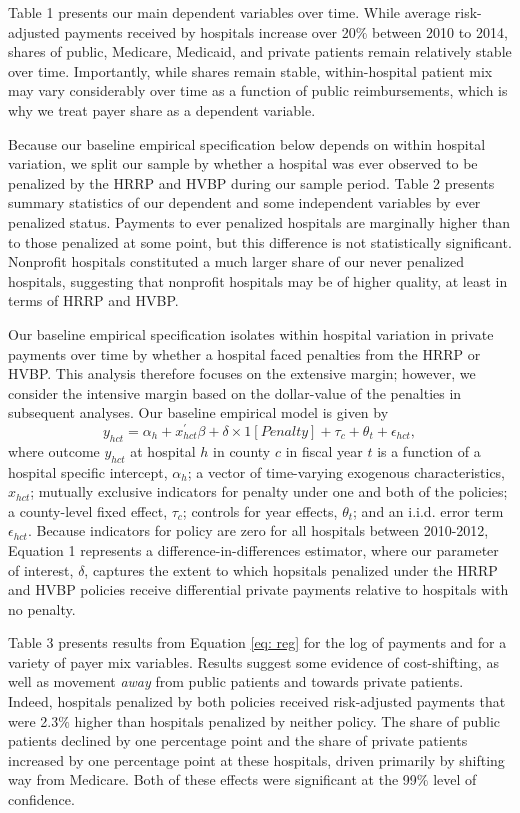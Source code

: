 \documentclass[12pt]{article}
\begin{document}
Table 1 presents our main dependent variables over time. While average risk-adjusted payments received by hospitals increase over 20$\%$ between 2010 to 2014, shares of public, Medicare, Medicaid, and private patients remain relatively stable over time.  Importantly, while shares remain stable, within-hospital patient mix may vary considerably over time as a function of public reimbursements, which is why we treat payer share as a dependent variable.

Because our baseline empirical specification below depends on within hospital variation, we split our sample by whether a hospital was ever observed to be penalized by the HRRP and HVBP during our sample period.  Table 2 presents summary statistics of our dependent and some independent variables by ever penalized status.  Payments to ever penalized hospitals are marginally higher than to those penalized at some point, but this difference is not statistically significant.  Nonprofit hospitals constituted a much larger share of our never penalized hospitals, suggesting that nonprofit hospitals may be of higher quality, at least in terms of HRRP and HVBP.

Our baseline empirical specification isolates within hospital variation in private payments over time by whether a hospital faced penalties from the HRRP or HVBP. This analysis therefore focuses on the extensive margin; however, we consider the intensive margin based on the dollar-value of the penalties in subsequent analyses. Our baseline empirical model is given by
\begin{equation}
\label{eq: reg}
y_{hct} = \alpha_{h} + x^{'}_{hct}\beta + \delta \times 1[Penalty] + \tau_{c} + \theta_{t}  +  \epsilon_{hct},
\end{equation}
where outcome $y_{hct}$ at hospital $h$ in county $c$ in fiscal year $t$ is a function of a hospital specific intercept, $\alpha_{h}$; a vector of time-varying exogenous characteristics, $x_{hct}$; mutually exclusive indicators for penalty under one and both of the policies; a county-level fixed effect, $\tau_c$; controls for year effects, $\theta_t$; and an i.i.d. error term $\epsilon_{hct}$.  Because indicators for policy are zero for all hospitals between 2010-2012, Equation 1 represents a difference-in-differences estimator, where our parameter of interest, $\delta$, captures the extent to which hopsitals penalized under the HRRP and HVBP policies receive differential private payments relative to hospitals with no penalty.

Table 3 presents results from Equation \ref{eq: reg} for the log of payments and for a variety of payer mix variables.  Results suggest some evidence of cost-shifting, as well as movement \textit{away} from public patients and towards private patients.  Indeed, hospitals penalized by both policies received risk-adjusted payments that were 2.3$\%$ higher than hospitals penalized by neither policy.  The share of public patients declined by one percentage point and the share of private patients increased by one percentage point at these hospitals, driven primarily by shifting way from Medicare.  Both of these effects were significant at the 99$\%$ level of confidence.
\end{document}
